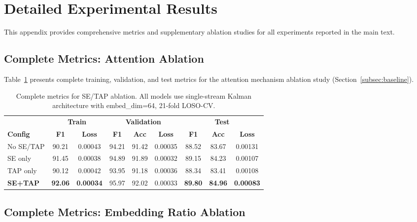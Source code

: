 
\section{Detailed Experimental Results}
\label{app:detailed}

This appendix provides comprehensive metrics and supplementary ablation studies for all experiments reported in the main text.

\subsection{Complete Metrics: Attention Ablation}
\label{app:se_tap_full}

Table~\ref{tab:se_tap_full} presents complete training, validation, and test metrics for the attention mechanism ablation study (Section~\ref{subsec:baseline}).

\begin{table}[H]
\caption{Complete metrics for SE/TAP ablation. All models use single-stream Kalman architecture with embed\_dim=64, 21-fold LOSO-CV.}
\label{tab:se_tap_full}
\centering
\small
\begin{tabular}{lcccccccc}
\toprule
& \multicolumn{2}{c}{\textbf{Train}} & \multicolumn{3}{c}{\textbf{Validation}} & \multicolumn{3}{c}{\textbf{Test}} \\
\cmidrule(lr){2-3} \cmidrule(lr){4-6} \cmidrule(lr){7-9}
\textbf{Config} & \textbf{F1} & \textbf{Loss} & \textbf{F1} & \textbf{Acc} & \textbf{Loss} & \textbf{F1} & \textbf{Acc} & \textbf{Loss} \\
\midrule
No SE/TAP & 90.21 & 0.00043 & 94.21 & 91.42 & 0.00035 & 88.52 & 83.67 & 0.00131 \\
SE only & 91.45 & 0.00038 & 94.89 & 91.89 & 0.00032 & 89.15 & 84.23 & 0.00107 \\
TAP only & 90.12 & 0.00042 & 93.95 & 91.18 & 0.00036 & 88.34 & 83.41 & 0.00108 \\
\textbf{SE+TAP} & \textbf{92.06} & \textbf{0.00034} & 95.97 & 92.02 & 0.00033 & \textbf{89.80} & \textbf{84.96} & \textbf{0.00083} \\
\bottomrule
\end{tabular}
\end{table}

\subsection{Complete Metrics: Embedding Ratio Ablation}
\label{app:embed_full}

